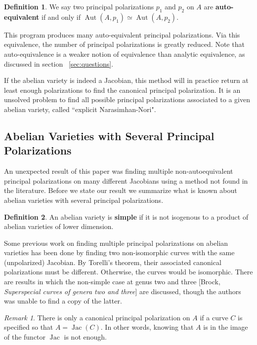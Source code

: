 \documentclass[12pt,reqno]{amsart}
\DeclareMathOperator{\Aut}{Aut}
\DeclareMathOperator{\Jac}{Jac}
\theoremstyle{definition}
\newtheorem{defn}{Definition}
\theoremstyle{remark}
\newtheorem*{remark}{Remark}
\begin{document}


\begin{defn} We say two principal polarizations $p_1$ and $p_2$ on $A$ are \textbf{auto-equivalent} if and only if $\Aut(A, p_1) \simeq \Aut(A, p_2)$. \end{defn}

This program produces many auto-equivalent principal polarizations. Via this equivalence, the number of principal polarizations is greatly reduced. Note that auto-equivalence is a weaker notion of equivalence than analytic equivalence, as discussed in section ~\ref{sec:questions}. 

If the abelian variety is indeed a Jacobian, this method will in practice return at least enough polarizations to find the canonical principal polarization. It is an unsolved problem to find all possible principal polarizations associated to a given abelian variety, called ``explicit Narasimhan-Nori". 

\subsection{Abelian Varieties with Several Principal Polarizations}
\label{sec:accident}
An unexpected result of this paper was finding multiple non-autoequivalent principal polarizations on many different Jacobians using a method not found in the literature. Before we state our result we summarize what is known about abelian varieties with several principal polarizations.

\begin{defn} An abelian variety is \textbf{simple} if it is not isogenous to a product of abelian varieties of lower dimension. \end{defn}

Some previous work on finding multiple principal polarizations on abelian varieties has been done by finding two non-isomorphic curves with the same (unpolarized) Jacobian. By Torelli's theorem, their associated canonical polarizations must be different. Otherwise, the curves would be isomorphic. There are results in which the non-simple case at genus two \cite{iko} and three [Brock, \textit{Superspecial curves of genera two and three}] are discussed, though the authors was unable to find a copy of the latter. 

\begin{remark} There is only a canonical principal polarization on $A$ if a curve $C$ is specified so that $A = \Jac(C).$ In other words, knowing that $A$ is in the image of the functor $\Jac$ is not enough. \end{remark}
\end{document}
